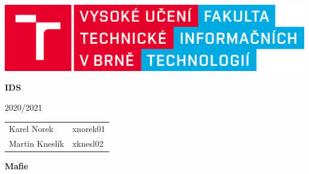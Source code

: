 \documentclass{article}
\begin{document}
\begin{titlepage}
    \begin{center}
        \includegraphics[scale=0.1,keepaspectratio]{fig/logo_cz.png}
        
        \vspace{3cm}
        
        {\Huge \textbf{IDS}}
        
        \vspace{0.25cm}
        
        {\LARGE 2020/2021}
        
        \vspace{2cm}
        \Large
        \begin{tabular}{l l}
                    Karel Norek & xnorek01 \\
    				Martin Kneslík & xknesl02 \\
    	\end{tabular}
    \end{center}

\end{titlepage}

\textbf{\flushleft \LARGE Mafie}

\vspace{0.25cm}
\end{document}
